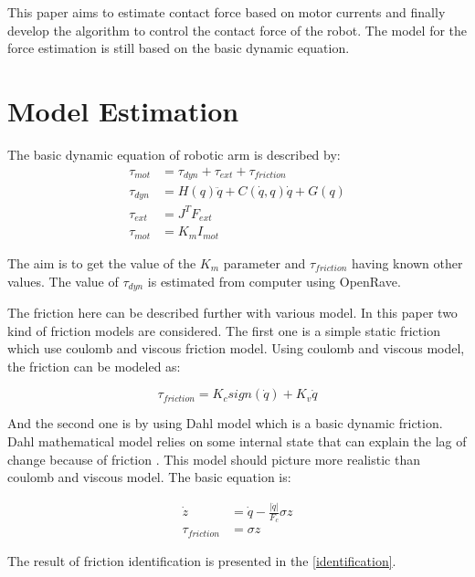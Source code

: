 \documentclass[letterpaper, 10 pt, conference]{ieeeconf}
\begin{document}
This paper aims to estimate contact force based on motor currents and finally develop the algorithm to control the contact force of the robot. The model for the force estimation is still based on the basic dynamic equation. 


      \section{Model Estimation}
The basic dynamic equation of robotic arm is described by:
\begin{align}
  \tau_{mot} &= \tau_{dyn} + \tau_{ext} + \tau_{friction}\\
  \tau_{dyn} &= H\left(q\right)\ddot{q} + C\left(\dot{q} , q \right)\dot{q} + G\left(q \right)\\
  \tau_{ext} &= J^{T} F_{ext}\\
  \tau_{mot} &= K_{m} I_{mot}
\end{align}

The aim is to get the value of the $K_{m}$ parameter and $\tau_{friction}$ having known other values. The value of $\tau_{dyn}$ is estimated from computer using OpenRave.

The friction here can be described further with various model. In this paper two kind of friction models are considered. The first one is a simple static friction which use coulomb and viscous friction model. Using coulomb and viscous model, the friction can be modeled as:

\begin{equation}
  \tau_{friction} = K_{c} sign\left(\dot{q}\right) + K_{v} \dot{q}
\end{equation}

And the second one is by using Dahl model which is a basic dynamic friction. Dahl mathematical model relies on some internal state that can explain the lag of change because of friction \cite{Bona05}. This model should picture more realistic than coulomb and viscous model. The basic equation is: 

\begin{align}
  \dot{z} &= \dot{q} - \frac{\left|\dot{q}\right|}{F_{c}} \sigma z \\
  \tau_{friction} &= \sigma z
\end{align}

The result of friction identification is presented in the \ref{identification}.
\end{document}

